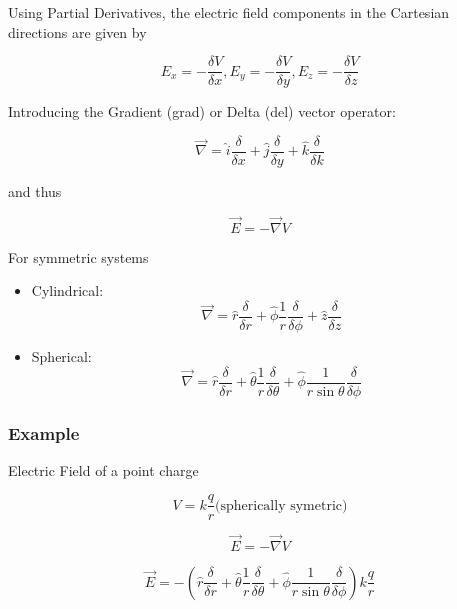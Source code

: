 \documentclass[14pt]{memoir}
\begin{document}
Using Partial Derivatives, the electric field components in the Cartesian directions are given by

\begin{equation}
E_x = -\frac{\delta V}{\delta x}, E_y = -\frac{\delta V}{\delta y}, E_z = -\frac{\delta V}{\delta z}
\end{equation}

Introducing the Gradient (grad) or Delta (del) vector operator:

\begin{equation}
\vec{\nabla} = \hat{i} \frac{\delta}{\delta x} + \hat{j} \frac{\delta}{\delta y} + \hat{k} \frac{\delta}{\delta k}
\end{equation}

and thus

\begin{equation}
\vec{E} = -\vec{\nabla}V
\end{equation}

For symmetric systems
\begin{itemize}
\item Cylindrical:
\begin{equation}
\vec{\nabla} = \hat{r} \frac{\delta}{\delta r} + \hat{\phi} \frac{1}{r}\frac{\delta}{\delta \phi} + \hat{z} \frac{\delta}{\delta z}
\end{equation}
\item Spherical:
\begin{equation}
\vec{\nabla} = \hat{r} \frac{\delta}{\delta r} + \hat{\theta} \frac{1}{r}\frac{\delta}{\delta \theta} + \hat{\phi} \frac{1}{r\sin{\theta}}\frac{\delta}{\delta \phi}
\end{equation}
\end{itemize}

\subsubsection{Example}

Electric Field of a point charge

\begin{equation}
V = k\frac{q}{r} \text{(spherically symetric)}
\end{equation}

\begin{equation}
\vec{E} = -\vec{\nabla}V
\end{equation}

\begin{equation}
\vec{E} = - (\hat{r} \frac{\delta}{\delta r} + \hat{\theta} \frac{1}{r}\frac{\delta}{\delta \theta} + \hat{\phi} \frac{1}{r\sin{\theta}}\frac{\delta}{\delta \phi}) k\frac{q}{r}
\end{equation}
\end{document}
